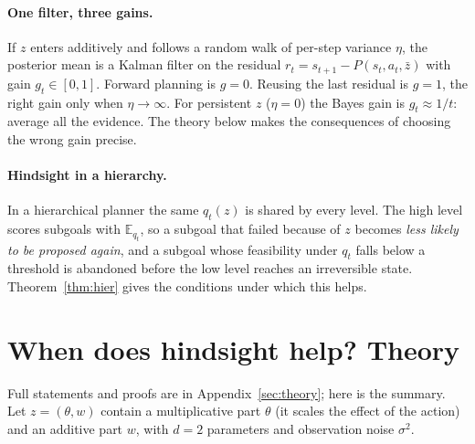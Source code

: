 \documentclass[11pt]{article}
\begin{document}
\paragraph{One filter, three gains.} If $z$ enters additively and follows a random walk of per-step variance $\eta$, the
posterior mean is a Kalman filter on the residual $r_t=s_{t+1}-P(s_t,a_t,\bar z)$ with gain $g_t\in[0,1]$. Forward
planning is $g=0$. Reusing the last residual \citep{cwm_2611_24778} is $g=1$, the right gain only when $\eta\to\infty$.
For persistent $z$ ($\eta=0$) the Bayes gain is $g_t\approx1/t$: average all the evidence. The theory below makes the
consequences of choosing the wrong gain precise.

\paragraph{Hindsight in a hierarchy.} In a hierarchical planner the same $q_t(z)$ is shared by every level. The high
level scores subgoals with $\mathbb E_{q_t}$, so a subgoal that failed because of $z$ becomes \emph{less likely to be
proposed again}, and a subgoal whose feasibility under $q_t$ falls below a threshold is abandoned before the low level
reaches an irreversible state. Theorem~\ref{thm:hier} gives the conditions under which this helps.

\section{When does hindsight help? Theory}
\label{sec:theory-summary}

Full statements and proofs are in Appendix~\ref{sec:theory}; here is the summary. Let $z=(\theta,w)$ contain a
multiplicative part $\theta$ (it scales the effect of the action) and an additive part $w$, with $d=2$ parameters and
observation noise $\sigma^2$.
\end{document}
